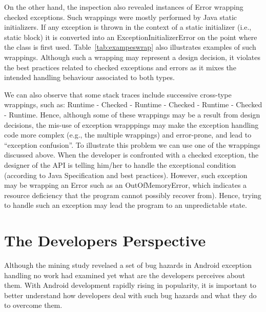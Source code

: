 On the other hand, the inspection 
also revealed instances of Error wrapping checked exceptions. Such wrappings were 
mostly performed by Java static initializers. If any exception is thrown in the context of a static initializer 
(i.e., static block)  it is converted into an ExceptionInitializerError 
on the point where the class is first used.  Table~\ref{tab:exampeswrap} also illustrates
examples of such wrappings. Although such a wrapping may represent a design decision,
it violates the best practices related to checked exceptions and errors as it mixes the intended handling 
behaviour associated to both types.

We can also observe that some stack traces include successive cross-type wrappings, 
such as: Runtime - Checked - Runtime - Checked - Runtime - Checked -
Runtime. 
Hence, although some of these wrappings may be a result from design decisions, the mis-use of exception wrapppings may make the exception handling 
code more complex (e.g., the multiple wrappings) and error-prone,
 and lead to ``exception confusion''. To illustrate this problem we can use one of the wrappings discussed above.
When the developer is confronted with a checked exception, the designer of the API is telling him/her 
to handle the exceptional condition (according to Java Specification and 
best practices). However, such exception may be wrapping an Error such
as an OutOfMemoryError, which indicates a resource deficiency 
that the program cannot possibly recover from). Hence, trying to
handle such an exception  
may lead the program to an unpredictable state.

\bigskip


\bigskip

\section{The Developers Perspective}
\label{sec:dev}

Although the mining study revelaed a set of bug hazards in Android exception handling no work had examined yet what are the developers perceives about them. With Android development rapidly rising in popularity, it is important to better understand how developers deal with such bug hazards and what they do to overcome them. 

